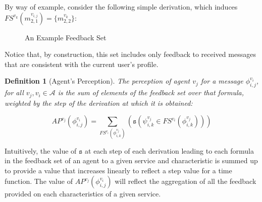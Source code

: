 \documentclass[compsoc, conference, letterpaper, 10pt, times]{IEEEtran}
\newtheorem{definition}{Definition}
\begin{document}
By way of example, consider the following simple derivation, which induces $FS^{v_{k}}(m^{v_{i,j}}_{2,1})=\{m^{v_{k}}_{2,2}\}$: 

\begin{figure*}
\begin{footnotesize}

	\begin{prooftree}
		
		\end{prooftree}
\end{footnotesize}


	\caption{An Example Feedback Set}\label{fig:ask}

\end{figure*}

Notice that, by construction, this set includes only feedback to received messages that are consistent with the current user's profile. 

\begin{definition}[Agent's Perception]
The perception of agent $v_{j}$ for a message $\phi^{v_{i}}_{i,j}$, for all $v_{j}, v_{i} \in \mathcal{A}$ is the sum of elements of the feedback set over that formula, weighted by the step of the derivation at which it is obtained: 

\[
AP^{v_{j}}(\phi^{v_{i}}_{i,j})=\sum_{FS^{v_{i}}(\phi^{v_{j}}_{i,k})}(\mathtt{s}(\psi^{v_{j}}_{i,k} \in FS^{v_{i}}(\phi^{v_{j}}_{i,k})))
\]

\end{definition}

Intuitively, the value of $\mathtt{s}$ at each step of each derivation leading to each formula in the feedback set of an agent to a given service and characteristic is summed up to provide a value that increases linearly to reflect a step value for a time function. The value of $AP^{v_{j}}(\phi^{v_{i}}_{i,j})$ will reflect the aggregation of all the feedback provided on each characteristics of a given service.  
\end{document}
